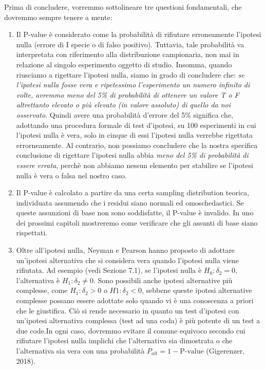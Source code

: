\documentclass[
  12pt,
]{book}
\providecommand{\tightlist}{%
  \setlength{\itemsep}{0pt}\setlength{\parskip}{0pt}}
\begin{document}
Prima di concludere, vorremmo sottolineare tre questioni fondamentali, che dovremmo sempre tenere a mente:

\begin{enumerate}
\def\labelenumi{\arabic{enumi}.}
\tightlist
\item
  Il P-value è considerato come la probabilità di rifiutare erroneamente l'ipotesi nulla (errore di I specie o di falso positivo). Tuttavia, tale probabilità va interpretata con riferimento alla distribuzione campionaria, non mai in relazione al singolo esperimento oggetto di studio. Insomma, quando riusciamo a rigettare l'ipotesi nulla, siamo in grado di concludere che: \emph{se l'ipotesi nulla fosse vera e ripetessimo l'esperimento un numero infinito di volte, avremmo meno del 5\% di probabilità di ottenere un valore T o F altrettanto elevato o più elevato (in valore assoluto) di quello da noi osservato}. Quindi avere una probabilità d'errore del 5\% significa che, adottando una procedura formale di test d'ipotesi, su 100 esperimenti in cui l'ipotesi nulla è vera, solo in cinque di essi l'ipotesi nulla verrebbe rigettata errorneamente. Al contrario, non possiamo concludere che la nostra specifica conclusione di rigettare l'ipotesi nulla abbia \emph{meno del 5\% di probabilità di essere errata}, perchè non abbiamo nessun elemento per stabilire se l'ipotesi nulla è vera o falsa nel nostro caso.
\item
  Il P-value è calcolato a partire da una certa sampling distribution teorica, individuata assumendo che i residui siano normali ed omoschedastici. Se queste assunzioni di base non sono soddisfatte, il P-value è invalido. In uno dei prossimi capitoli mostreremo come verificare che gli assunti di base siano rispettati.
\item
  Oltre all'ipotesi nulla, Neyman e Pearson hanno proposto di adottare un'ipotesi alternativa che si considera vera quando l'ipotesi nulla viene rifiutata. Ad esempio (vedi Sezione 7.1), se l'ipotesi nulla è \(H_0: \delta_2 = 0\), l'alternativa è \(H_1: \delta_2 \neq 0\). Sono possibili anche ipotesi alternative più complesse, come \(H_1: \delta_2 > 0\) o \(H1: \delta_2 < 0\), sebbene queste ipotesi alternative complesse possano essere adottate solo quando vi è una conoscenza a priori che le giustifica. Ciò si rende necessario in quanto un test d'ipotesi con un'ipotesi alternativa complessa (test ad una coda) è più potente di un test a due code.In ogni caso, dovremmo evitare il comune equivoco secondo cui rifiutare l'ipotesi nulla implichi che l'alternativa sia dimostrata o che l'alternativa sia vera con una probabilità \(P_{alt} = 1 - \textrm{P-value}\) (Gigerenzer, 2018).

\end{enumerate}
\end{document}

